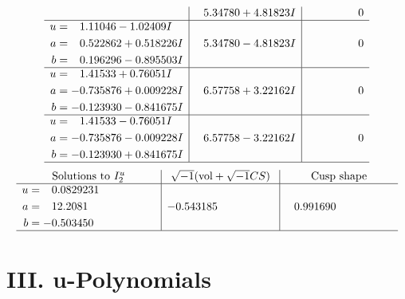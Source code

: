 \documentclass[1p]{elsarticle_modified}
\theoremstyle{definition}
\newcommand{\I}{\sqrt{-1}}
\begin{document}
$$\begin{array}{c|c|c}
 & \phantom{-}5.34780 + 4.81823 I & \phantom{-0.000000 } 0 \\ \hline\begin{aligned}
u &= \phantom{-}1.11046 - 1.02409 I \\
a &= \phantom{-}0.522862 + 0.518226 I \\
b &= \phantom{-}0.196296 - 0.895503 I\end{aligned}
 & \phantom{-}5.34780 - 4.81823 I & \phantom{-0.000000 } 0 \\ \hline\begin{aligned}
u &= \phantom{-}1.41533 + 0.76051 I \\
a &= -0.735876 + 0.009228 I \\
b &= -0.123930 - 0.841675 I\end{aligned}
 & \phantom{-}6.57758 + 3.22162 I & \phantom{-0.000000 } 0 \\ \hline\begin{aligned}
u &= \phantom{-}1.41533 - 0.76051 I \\
a &= -0.735876 - 0.009228 I \\
b &= -0.123930 + 0.841675 I\end{aligned}
 & \phantom{-}6.57758 - 3.22162 I & \phantom{-0.000000 } 0\\
 \hline 
 \end{array}$$\newpage$$\begin{array}{c|c|c}  
\text{Solutions to }I^u_{2}& \I (\text{vol} + \sqrt{-1}CS) & \text{Cusp shape}\\
 \hline 
\begin{aligned}
u &= \phantom{-}0.0829231\phantom{ +0.000000I} \\
a &= \phantom{-}12.2081\phantom{ +0.000000I} \\
b &= -0.503450\phantom{ +0.000000I}\end{aligned}
 & -0.543185\phantom{ +0.000000I} & \phantom{-}0.991690\phantom{ +0.000000I}\\
 \hline 
 \end{array}$$\newpage
\newpage\renewcommand{\arraystretch}{1}
\centering \section*{ III. u-Polynomials}
\end{document}
